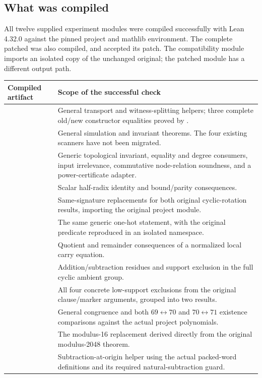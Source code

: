 \subsection{What was compiled}

All twelve supplied experiment modules were compiled successfully with Lean 4.32.0 against the pinned project and mathlib environment. The complete patched  was also compiled, and  accepted its patch. The compatibility module imports an isolated copy of the unchanged original; the patched module has a different output path.

\begin{longtable}{L{0.34\textwidth}L{0.55\textwidth}}
\toprule
Compiled artifact & Scope of the successful check\\
\midrule
\endhead
{} & General transport and witness-splitting helpers; three complete old/new constructor equalities proved by .\\
 & General simulation and invariant theorems. The four existing scanners have not been migrated.\\
 & Generic topological invariant, equality and degree consumers, input irrelevance, commutative node-relation soundness, and a power-certificate adapter.\\
 & Scalar half-radix identity and bound/parity consequences.\\
 & Same-signature replacements for both original cyclic-rotation results, importing the original project module.\\
 & The same generic one-hot statement, with the original predicate reproduced in an isolated namespace.\\
 & Quotient and remainder consequences of a normalized local carry equation.\\
 & Addition/subtraction residues and support exclusion in the full cyclic ambient group.\\
 & All four concrete low-support exclusions from the original clause/marker arguments, grouped into two results.\\
 & General congruence and both $69\leftrightarrow70$ and $70\leftrightarrow71$ existence comparisons against the actual project polynomials.\\
 & The modulus-16 replacement derived directly from the original modulus-2048 theorem.\\
 & Subtraction-at-origin helper using the actual packed-word definitions and its required natural-subtraction guard.\\
\bottomrule
\end{longtable}

